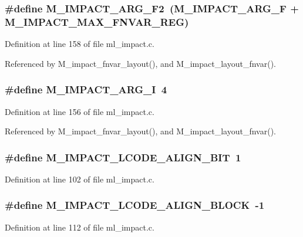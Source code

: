 \subsubsection{\setlength{\rightskip}{0pt plus 5cm}\#define M\_\-IMPACT\_\-ARG\_\-F2~(M\_\-IMPACT\_\-ARG\_\-F + M\_\-IMPACT\_\-MAX\_\-FNVAR\_\-REG)}\label{ml__impact_8c_192a6455dd431ab531c420c9f9f56892}




Definition at line 158 of file ml\_\-impact.c.

Referenced by M\_\-impact\_\-fnvar\_\-layout(), and M\_\-impact\_\-layout\_\-fnvar().
\subsubsection{\setlength{\rightskip}{0pt plus 5cm}\#define M\_\-IMPACT\_\-ARG\_\-I~4}\label{ml__impact_8c_3a899964f41b4457965580de385fdfe1}




Definition at line 156 of file ml\_\-impact.c.

Referenced by M\_\-impact\_\-fnvar\_\-layout(), and M\_\-impact\_\-layout\_\-fnvar().
\subsubsection{\setlength{\rightskip}{0pt plus 5cm}\#define M\_\-IMPACT\_\-LCODE\_\-ALIGN\_\-BIT~1}\label{ml__impact_8c_2b9d5ea14aa692b7f6f31780c61b87c3}




Definition at line 102 of file ml\_\-impact.c.
\subsubsection{\setlength{\rightskip}{0pt plus 5cm}\#define M\_\-IMPACT\_\-LCODE\_\-ALIGN\_\-BLOCK~-1}\label{ml__impact_8c_5e9ebda09cc5a5d0fa76c1cbce8f8129}




Definition at line 112 of file ml\_\-impact.c.
